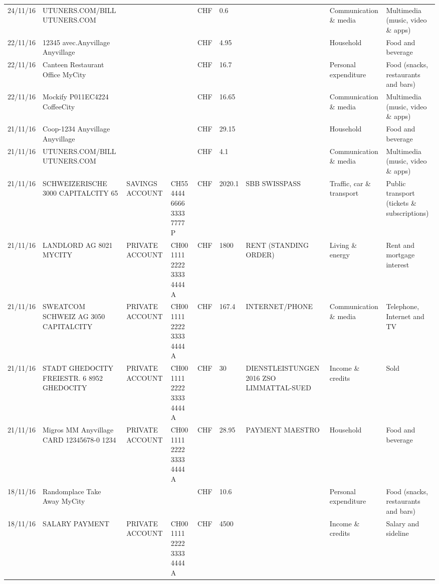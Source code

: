 \begin{landscape}
\begin{adjustwidth}{-2cm}{-2cm}
\begin{tiny}
\begin{longtable}{lp{4cm}llllp{3cm}ll}
		24/11/16 & UTUNERS.COM/BILL          UTUNERS.COM &       &       & CHF   & 0.6   &       & Communication \& media & Multimedia (music, video \& apps) \\
		22/11/16 & 12345 avec.Anyvillage   Anyvillage &       &       & CHF   & 4.95  &       & Household & Food and beverage \\
		22/11/16 & Canteen Restaurant Office      MyCity &       &       & CHF   & 16.7  &       & Personal expenditure & Food (snacks, restaurants and bars) \\
		22/11/16 & Mockify P011EC4224       CoffeeCity &       &       & CHF   & 16.65 &       & Communication \& media & Multimedia (music, video \& apps) \\
		21/11/16 & Coop-1234 Anyvillage    Anyvillage &       &       & CHF   & 29.15 &       & Household & Food and beverage \\
		21/11/16 & UTUNERS.COM/BILL          UTUNERS.COM &       &       & CHF   & 4.1   &       & Communication \& media & Multimedia (music, video \& apps) \\
		21/11/16 & SCHWEIZERISCHE 3000 CAPITALCITY 65 & SAVINGS ACCOUNT & CH55 4444 6666 3333 7777 P & CHF   & 2020.1 & SBB SWISSPASS & Traffic, car \& transport & Public transport (tickets \& subscriptions) \\
		21/11/16 & LANDLORD AG 8021 MYCITY & PRIVATE ACCOUNT & CH00 1111 2222 3333 4444 A & CHF   & 1800  & RENT (STANDING ORDER) & Living \& energy & Rent and mortgage interest \\
		21/11/16 & SWEATCOM SCHWEIZ AG 3050 CAPITALCITY & PRIVATE ACCOUNT & CH00 1111 2222 3333 4444 A & CHF   & 167.4 & INTERNET/PHONE & Communication \& media & Telephone,  Internet and TV \\
		21/11/16 & STADT GHEDOCITY FREIESTR. 6 8952 GHEDOCITY & PRIVATE ACCOUNT & CH00 1111 2222 3333 4444 A & CHF   & 30    & DIENSTLEISTUNGEN 2016      ZSO LIMMATTAL-SUED & Income \& credits & Sold \\
		21/11/16 & Migros MM Anyvillage CARD 12345678-0 1234 & PRIVATE ACCOUNT & CH00 1111 2222 3333 4444 A & CHF   & 28.95 & PAYMENT MAESTRO & Household & Food and beverage \\
		18/11/16 & Randomplace Take Away     MyCity &       &       & CHF   & 10.6  &       & Personal expenditure & Food (snacks, restaurants and bars) \\
		18/11/16 & SALARY PAYMENT & PRIVATE ACCOUNT & CH00 1111 2222 3333 4444 A & CHF   & 4500  &       & Income \& credits & Salary and sideline \\

\end{longtable}
\end{tiny}
\end{adjustwidth}
\end{landscape}
